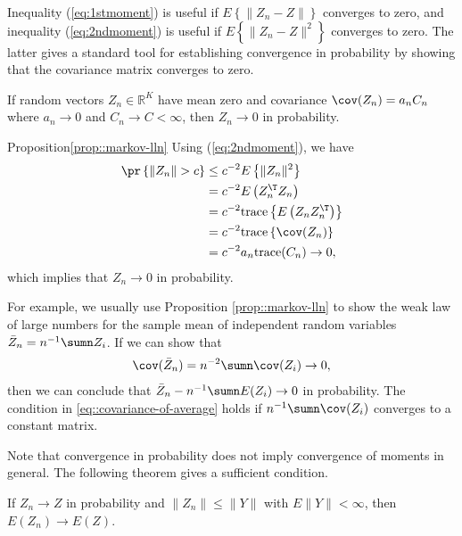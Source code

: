 Inequality (\ref{eq:1stmoment}) is useful if $E\left\{ \|Z_{n}-Z\|\right\} $
converges to zero, and inequality (\ref{eq:2ndmoment}) is useful
if $E\left\{ \|Z_{n}-Z\|^{2}\right\} $ converges to zero. The latter
gives a standard tool for establishing convergence in probability
by showing that the covariance matrix converges to zero.

\begin{proposition}\label{prop::markov-lln}
If random vectors $Z_{n}\in\mathbb{R}^{K}$ have mean zero and covariance
$\cov(Z_{n})=a_{n}C_{n}$ where $a_{n}\rightarrow0$ and $C_{n}\rightarrow C<\infty$,
then $Z_{n}\rightarrow0$ in probability. 
\end{proposition}


\begin{myproof}{Proposition}{\ref{prop::markov-lln}}
Using (\ref{eq:2ndmoment}), we have
\begin{align*}
\pr\left\{ \|Z_{n}\|>c\right\}  & \leq c^{-2}E\left\{ \|Z_{n}\|^{2}\right\} \\
 & =c^{-2}E\left(Z_{n}^{\T}Z_{n}\right)\\
 & =c^{-2}\text{trace}\left\{ E\left(Z_{n}Z_{n}^{\T}\right)\right\} \\
 & =c^{-2}\text{trace}\left\{ \cov(Z_{n})\right\} \\
 & =c^{-2}a_{n}\text{trace}(C_{n})\rightarrow0,
\end{align*}
which implies that $Z_{n}\rightarrow0$ in probability. 
\end{myproof}

For example, we usually use Proposition \ref{prop::markov-lln} to show the weak law of large numbers for the sample mean of independent random variables $\bar{Z}_n = n^{-1} \sumn Z_i$. If we can show that
\begin{eqnarray}
\cov( \bar{Z}_n   ) = n^{-2} \sumn \cov(Z_i) \rightarrow 0,
\label{eq::covariance-of-average}
\end{eqnarray}
then we can conclude that $\bar{Z}_n - n^{-1} \sumn E(Z_i) \rightarrow 0$ in probability. The condition in \eqref{eq::covariance-of-average} holds if $n^{-1} \sumn \cov(Z_i) $ converges to a constant matrix. 



Note that convergence in probability does not imply convergence of moments in general. The following theorem gives a sufficient condition. 


\begin{proposition}\label{prop::DCT}
If $Z_n \rightarrow Z$ in probability and $\| Z_n \| \leq \| Y \|$ with $E\| Y\| < \infty$, then $E(Z_n) \rightarrow E(Z)$. 
\end{proposition}


